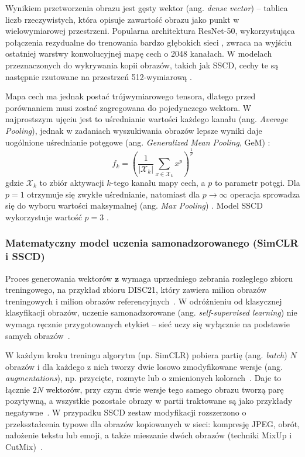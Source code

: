 Wynikiem przetworzenia obrazu jest gęsty wektor (ang. \textit{dense vector}) -- tablica liczb rzeczywistych, która opisuje zawartość obrazu jako punkt w wielowymiarowej przestrzeni. Popularna architektura ResNet-50, wykorzystująca połączenia rezydualne do trenowania bardzo głębokich sieci \cite{he2016resnet}, zwraca na wyjściu ostatniej warstwy konwolucyjnej mapę cech o 2048 kanałach. W modelach przeznaczonych do wykrywania kopii obrazów, takich jak SSCD, cechy te są następnie rzutowane na przestrzeń 512-wymiarową \cite{pizzi2022sscd, sscd_repo}.


Mapa cech ma jednak postać trójwymiarowego tensora, dlatego przed porównaniem musi zostać zagregowana do pojedynczego wektora. W najprostszym ujęciu jest to uśrednianie wartości każdego kanału (ang. \textit{Average Pooling}), jednak w zadaniach wyszukiwania obrazów lepsze wyniki daje uogólnione uśrednianie potęgowe (ang. \textit{Generalized Mean Pooling}, GeM) \cite{radenovic2018gem}:
$$f_k = \left( \frac{1}{|\mathcal{X}_k|} \sum_{x \in \mathcal{X}_k} x^{p} \right)^{\frac{1}{p}}$$
gdzie $\mathcal{X}_k$ to zbiór aktywacji $k$-tego kanału mapy cech, a $p$ to parametr potęgi. Dla $p = 1$ otrzymuje się zwykłe uśrednianie, natomiast dla $p \to \infty$ operacja sprowadza się do wyboru wartości maksymalnej (ang. \textit{Max Pooling}) \cite{radenovic2018gem}. Model SSCD wykorzystuje wartość $p = 3$ \cite{pizzi2022sscd}.


\subsubsection{Matematyczny model uczenia samonadzorowanego (SimCLR i SSCD)}


Proces generowania wektorów $\mathbf{z}$ wymaga uprzedniego zebrania rozległego zbioru treningowego, na przykład zbioru DISC21, który zawiera milion obrazów treningowych i milion obrazów referencyjnych~\cite{douze2021disc, pizzi2022sscd}. W odróżnieniu od klasycznej klasyfikacji obrazów, uczenie samonadzorowane (ang. \textit{self-supervised learning}) nie wymaga ręcznie przygotowanych etykiet -- sieć uczy się wyłącznie na podstawie samych obrazów~\cite{chen2020simclr}.


W każdym kroku treningu algorytm (np. SimCLR) pobiera partię (ang. \textit{batch}) $N$ obrazów i dla każdego z nich tworzy dwie losowo zmodyfikowane wersje (ang. \textit{augmentations}), np. przycięte, rozmyte lub o zmienionych kolorach~\cite{chen2020simclr}. Daje to łącznie $2N$ wektorów, przy czym dwie wersje tego samego obrazu tworzą parę pozytywną, a wszystkie pozostałe obrazy w partii traktowane są jako przykłady negatywne~\cite{chen2020simclr}. W przypadku SSCD zestaw modyfikacji rozszerzono o przekształcenia typowe dla obrazów kopiowanych w sieci: kompresję JPEG, obrót, nałożenie tekstu lub emoji, a także mieszanie dwóch obrazów (techniki MixUp i CutMix)~\cite{pizzi2022sscd}.



